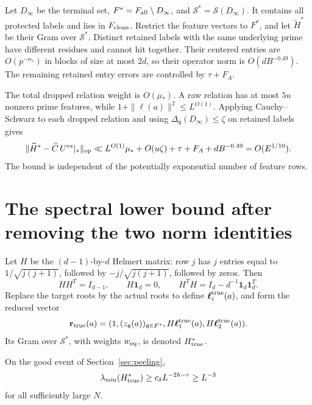 Let \(D_\infty\) be the terminal set, \(F^*=F_{\rm all}\setminus
D_\infty\), and \(\mathcal S^*=\mathcal S(D_\infty)\).
It contains all protected labels and lies in \(F_{\rm clean}\).
Restrict the feature vectors to \(F^*\), and let \(\widetilde H^*\)
be their Gram over \(\mathcal S^*\).
Distinct retained labels with the same underlying prime have
different residues and cannot hit together.  Their centered entries
are \(O(p^{-\alpha_s})\) in blocks of size at most \(2d\), so their
operator norm is \(O(dB^{-0.49})\).  The remaining retained entry
errors are controlled by \(\tau+F_A\).

The total dropped relation weight is \(O(\mu_*)\).  A raw relation
has at most \(5u\) nonzero prime features, while
\(1+\|\boldsymbol\ell(a)\|^2\le L^{O(1)}\).  Applying
Cauchy--Schwarz to each dropped relation and using
\(\Delta_{\mathfrak q}(D_\infty)\le\zeta\) on retained labels gives
\begin{equation}\label{eq:gram-error}
 \|\widetilde H^*-\widehat C\,U^{\rm ex}|_*\|_{\rm op}
 \ll L^{O(1)}\mu_*+O(u\zeta)+\tau+F_A+dB^{-0.49}
 =O(E^{1/10}).
\end{equation}
The bound is independent of the potentially exponential number of
feature rows.

\section{The spectral lower bound after removing the two norm identities}
\label{sec:spectral}

Let \(H\) be the \((d-1)\)-by-\(d\) Helmert matrix: row \(j\)
has \(j\) entries equal to \(1/\sqrt{j(j+1)}\), followed by
\(-j/\sqrt{j(j+1)}\), followed by zeros.  Then
\[
 HH^T=I_{d-1},\qquad H\mathbf1_d=0,\qquad
 H^TH=I_d-d^{-1}\mathbf1_d\mathbf1_d^T.
\]
Replace the target roots by the actual roots to define
\(\boldsymbol\ell_i^{\rm true}(a)\), and form the reduced vector
\[
 \mathbf r_{\rm true}(a)=
 (1,(z_{\mathfrak q}(a))_{\mathfrak q\in F^*},
             H\boldsymbol\ell_1^{\rm true}(a),
             H\boldsymbol\ell_2^{\rm true}(a)).
\]
Its Gram over \(\mathcal S^*\), with weights \(w_{\rm eq}\), is
denoted \(H_{\rm true}^*\).

\begin{proposition}\label{prop:positive-gram}
On the good event of Section~\ref{sec:peeling},
\[
 \lambda_{\min}(H_{\rm true}^*)
      \ge c_\delta L^{-2h-r}\ge L^{-3}
\]
for all sufficiently large \(N\).
\end{proposition}

